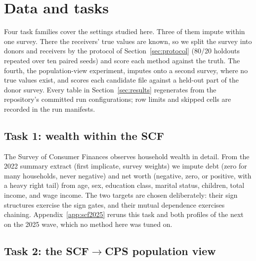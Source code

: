 \section{Data and tasks}
\label{sec:data}

Four task families cover the settings studied here. Three of them impute
within one survey. There the receivers' true values are known, so we split
the survey into donors and receivers by the protocol of
Section~\ref{sec:protocol} (80/20 holdouts repeated over ten paired seeds)
and score each method against the truth. The fourth, the population-view
experiment, imputes onto a second survey, where no true values exist, and
scores each candidate file against a held-out part of the donor survey.
Every table in Section~\ref{sec:results} regenerates from the repository's
committed run configurations; row limits and skipped cells are recorded in
the run manifests.

\subsection{Task 1: wealth within the SCF}
\label{sec:task-scf}

The Survey of Consumer Finances \citep{fed2023scf} observes household wealth
in detail. From the 2022 summary extract (first implicate, survey weights) we
impute debt (zero for many households, never negative) and net worth
(negative, zero, or positive, with a heavy right tail) from age, sex,
education class, marital status, children, total income, and wage income.
The two targets are chosen deliberately: their sign structures exercise the
sign gates, and their mutual dependence exercises chaining.
Appendix~\ref{app:scf2025} reruns this task and both profiles of the next
on the 2025 wave, which no method here was tuned on.

\subsection{Task 2: the SCF\texorpdfstring{$\to$}{->}CPS population view}
\label{sec:task-harness}

